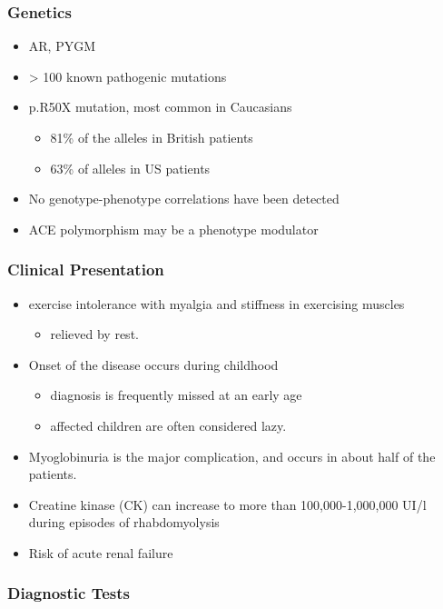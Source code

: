 \documentclass{scrartcl}
\begin{document}
\subsubsection{Genetics}
\label{sec:org79e7e1a}
\begin{itemize}
\item AR, PYGM
\item \textgreater{} 100 known pathogenic mutations
\item p.R50X mutation, most common in Caucasians
\begin{itemize}
\item 81\% of the alleles in British patients
\item 63\% of alleles in US patients
\end{itemize}
\item No genotype-phenotype correlations have been detected
\item ACE polymorphism may be a phenotype modulator
\end{itemize}

\subsubsection{Clinical Presentation}
\label{sec:org7b91f00}
\begin{itemize}
\item exercise intolerance with myalgia and stiffness in exercising muscles
\begin{itemize}
\item relieved by rest.
\end{itemize}
\item Onset of the disease occurs during childhood
\begin{itemize}
\item diagnosis is frequently missed at an early age
\item affected children are often considered lazy.
\end{itemize}
\item Myoglobinuria is the major complication, and occurs in about half of
the patients.
\item Creatine kinase (CK) can increase to more than 100,000-1,000,000
UI/l during episodes of rhabdomyolysis
\item Risk of acute renal failure
\end{itemize}

\subsubsection{Diagnostic Tests}
\label{sec:org9679864}
\end{document}
